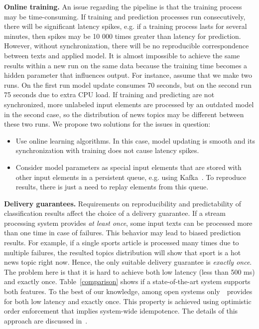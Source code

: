 \label {fs-challenges}

\indent

{\bf Online training.} An issue regarding the pipeline is that the training process may be time-consuming. If training and prediction processes run consecutively, there will be significant latency spikes, e.g. if a training process lasts for several minutes, then spikes may be 10 000 times greater than latency for prediction. However, without synchronization, there will be no reproducible correspondence between texts and applied model. It is almost impossible to achieve the same results within a new run on the same data because the training time becomes a hidden parameter that influences output. For instance, assume that we make two runs. On the first run model update consumes 70 seconds, but on the second run 75 seconds due to extra CPU load. If training and predicting are not synchronized, more unlabeled input elements are processed by an outdated model in the second case, so the distribution of news topics may be different between these two runs. We propose two solutions for the issues in question:

\begin{itemize}
    \item Use online learning algorithms. In this case, model updating is smooth and its synchronization with training does not cause latency spikes.
    \item Consider model parameters as special input elements that are stored with other input elements in a persistent queue, e.g. using Kafka~\cite{kreps2011kafka}. To reproduce results, there is just a need to replay elements from this queue.
\end{itemize}

{\bf Delivery guarantees.} Requirements on reproducibility and predictability of classification results affect the choice of a delivery guarantee. If a stream processing system provides {\em at least once}, some input texts can be processed more than one time in case of failures. This behavior may lead to biased prediction results. For example, if a single sports article is processed many times due to multiple failures, the resulted topics distribution will show that sport is a hot news topic right now. Hence, the only suitable delivery guarantee is {\em exactly once}. The problem here is that it is hard to achieve both low latency (less than 500 ms) and exactly once. Table~\ref{comparison} shows if a state-of-the-art system supports both features. To the best of our knowledge, among open systems only~\FlameStream\ provides for both low latency and exactly once. This property is achieved using optimistic order enforcement that implies system-wide idempotence. The details of this approach are discussed in~\cite{we2018beyondmr}.

